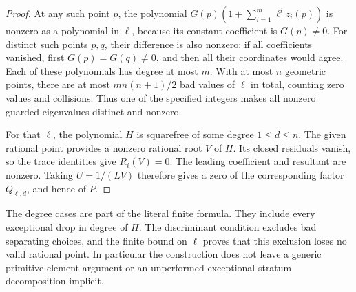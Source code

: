 \begin{proof}
At any such point $p$, the polynomial
$G(p)(1+\sum_{i=1}^m\ell^i z_i(p))$ is nonzero as a polynomial
in $\ell$, because its constant coefficient is $G(p)\ne0$.
For distinct such points $p,q$, their difference is also nonzero:
if all coefficients vanished, first $G(p)=G(q)\ne0$, and then
all their coordinates would agree. Each of these polynomials has
degree at most $m$. With at most $n$ geometric points, there are
at most $m n(n+1)/2$ bad values of $\ell$ in total, counting zero
values and collisions. Thus one of the specified integers makes
all nonzero guarded eigenvalues distinct and nonzero.

For that $\ell$, the polynomial $H$ is squarefree of some degree
$1\le d\le n$. The given rational point provides a nonzero
rational root $V$ of $H$. Its closed residuals vanish, so the trace
identities give $R_i(V)=0$. The leading coefficient and resultant
are nonzero. Taking $U=1/(LV)$ therefore gives a zero of the
corresponding factor $Q_{\ell,d}$, and hence of $P$.
\end{proof}

The degree cases are part of the literal finite formula. They include
every exceptional drop in degree of $H$. The discriminant condition
excludes bad separating choices, and the finite bound on $\ell$ proves
that this exclusion loses no valid rational point. In particular the
construction does not leave a generic primitive-element argument or an
unperformed exceptional-stratum decomposition implicit.
